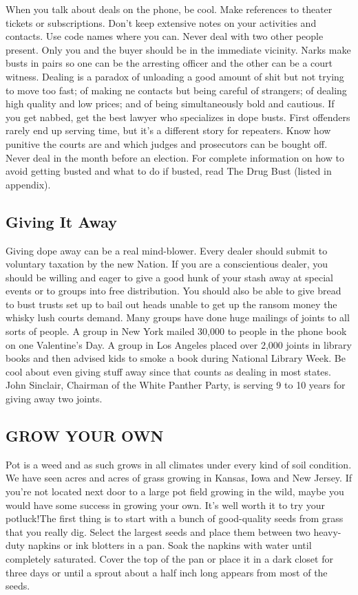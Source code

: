 \documentclass[11pt,twoside,a4paper]{book}
\begin{document}
When you talk about deals on the phone, be cool. Make references to theater tickets or subscriptions. Don't keep extensive notes on your activities and contacts. Use code names where you can. Never deal with two other people present. Only you and the buyer should be in the immediate vicinity. Narks make busts in pairs so one can be the arresting officer and the other can be a court witness. Dealing is a paradox of unloading a good amount of shit but not trying to move too fast; of making ne contacts but being careful of strangers; of dealing high quality and low prices; and of being simultaneously bold and cautious. If you get nabbed, get the best lawyer who specializes in dope busts. First offenders rarely end up serving time, but it's a different story for repeaters. Know how punitive the courts are and which judges and prosecutors can be bought off. Never deal in the month before an election. For complete information on how to avoid getting busted and what to do if busted, read The Drug Bust (listed in appendix).~\\

\subsection{Giving It Away}

Giving dope away can be a real mind-blower. Every dealer should submit to voluntary taxation by the new Nation. If you are a conscientious dealer, you should be willing and eager to give a good hunk of your stash away at special events or to groups into free distribution. You should also be able to give bread to bust trusts set up to bail out heads unable to get up the ransom money the whisky lush courts demand. Many groups have done huge mailings of joints to all sorts of people. A group in New York mailed 30,000 to people in the phone book on one Valentine's Day. A group in Los Angeles placed over 2,000 joints in library books and then advised kids to smoke a book during National Library Week. Be cool about even giving stuff away since that counts as dealing in most states. John Sinclair, Chairman of the White Panther Party, is serving 9 to 10 years for giving away two joints.

\subsection{GROW YOUR OWN}

Pot is a weed and as such grows in all climates under every kind of soil condition. We have seen acres and acres of grass growing in Kansas, Iowa and New Jersey. If you're not located next door to a large pot field growing in the wild, maybe you would have some success in growing your own. It's well worth it to try your potluck!The first thing is to start with a bunch of good-quality seeds from grass that you really dig. Select the largest seeds and place them between two heavy-duty napkins or ink blotters in a pan. Soak the napkins with water until completely saturated. Cover the top of the pan or place it in a dark closet for three days or until a sprout about a half inch long appears from most of the seeds.~\\
\end{document}
